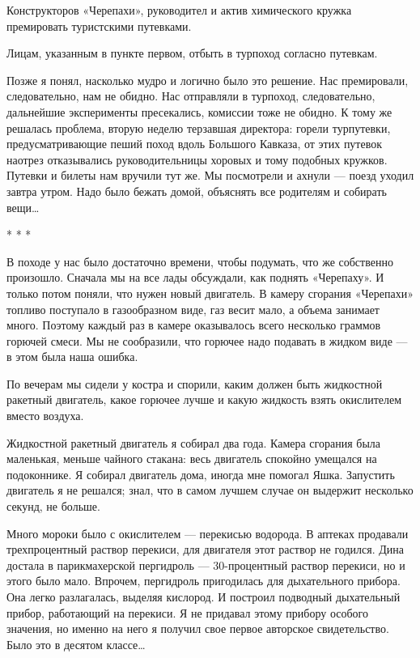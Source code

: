 Конструкторов  «Черепахи»,   руководител   и  актив   химического   кружка
премировать туристскими путевками.

Лицам, указанным в пункте первом, отбыть в турпоход согласно путевкам.

Позже  я  понял,  насколько  мудро   и  логично  было  это  решение.   Нас
премировали, следовательно,  нам не  обидно.  Нас отправляли  в  турпоход,
следовательно,  дальнейшие  эксперименты  пресекались,  комиссии  тоже  не
обидно. К тому  же решалась проблема,  вторую неделю терзавшая  директора:
горели турпутевки, предусматривающие пеший  поход вдоль Большого  Кавказа,
от этих  путевок  наотрез  отказывались руководительницы  хоровых  и  тому
подобных кружков. Путевки  и билеты нам  вручили тут же.  Мы посмотрели  и
ахнули — поезд уходил завтра утром. Надо было бежать домой, объяснять  все
родителям и собирать вещи…

* * *

В походе у нас было достаточно времени, чтобы подумать, что же  собственно
произошло. Сначала мы  на все  лады обсуждали, как  поднять «Черепаху».  И
только  потом  поняли,  что  нужен  новый  двигатель.  В  камеру  сгорания
«Черепахи» топливо поступало в газообразном виде, газ весит мало, а объема
занимает много. Поэтому  каждый раз в  камере оказывалось всего  несколько
граммов горючей  смеси. Мы  не  сообразили, что  горючее надо  подавать  в
жидком виде — в этом была наша ошибка.

По вечерам мы  сидели у  костра и  спорили, каким  должен быть  жидкостной
ракетный двигатель, какое горючее лучше и какую жидкость взять окислителем
вместо воздуха.

Жидкостной ракетный двигатель  я собирал  два года.  Камера сгорания  была
маленькая, меньше  чайного стакана:  весь двигатель  спокойно умещался  на
подоконнике. Я собирал двигатель дома, иногда мне помогал Яшка.  Запустить
двигатель я  не решался;  знал,  что в  самом  лучшем случае  он  выдержит
несколько секунд, не больше.

Много мороки было с окислителем — перекисью водорода. В аптеках  продавали
трехпроцентный раствор перекиси,  для двигателя этот  раствор не  годился.
Дина достала в парикмахерской пергидроль — 30-процентный раствор перекиси,
но и этого  было мало.  Впрочем, пергидроль  пригодилась для  дыхательного
прибора. Она  легко разлагалась,  выделяя кислород.  И построил  подводный
дыхательный прибор, работающий  на перекиси. Я  не придавал этому  прибору
особого значения,  но  именно на  него  я получил  свое  первое  авторское
свидетельство. Было это в десятом классе…

